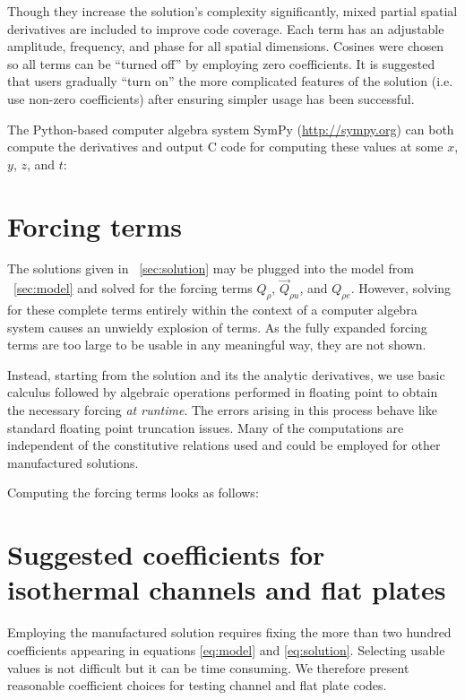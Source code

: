\documentclass[10pt,reqno]{amsart}
\begin{document}
Though they increase the solution's complexity significantly, mixed partial
spatial derivatives are included to improve code coverage.  Each term has an
adjustable amplitude, frequency, and phase for all spatial dimensions.  Cosines
were chosen so all terms can be ``turned off'' by employing zero coefficients.
It is suggested that users gradually ``turn on'' the more complicated features
of the solution (i.e. use non-zero coefficients) after ensuring simpler usage
has been successful.

The Python-based computer algebra system SymPy (\url{http://sympy.org})
can both compute the derivatives and output C code for computing these
values at some $x$, $y$, $z$, and $t$:


\section{Forcing terms}
\label{sec:forcing}

The solutions given in \textsection~\ref{sec:solution} may be plugged into the
model from \textsection~\ref{sec:model} and solved for the forcing terms
$Q_{\rho}$, $\vec{Q}_{\rho{}u}$, and $Q_{\rho{}e}$.  However, solving for these
complete terms entirely within the context of a computer algebra system causes
an unwieldy explosion of terms.  As the fully expanded forcing terms are too
large to be usable in any meaningful way, they are not shown.

Instead, starting from the solution and its the analytic derivatives, we use
basic calculus followed by algebraic operations performed in floating point to
obtain the necessary forcing \emph{at runtime}.  The errors arising in this
process behave like standard floating point truncation issues.  Many of the
computations are independent of the constitutive relations used and could be
employed for other manufactured solutions.

Computing the forcing terms looks as follows:


\section{Suggested coefficients for isothermal channels and flat plates}
\label{sec:suggest}

Employing the manufactured solution requires fixing the more than two hundred
coefficients appearing in equations \eqref{eq:model} and \eqref{eq:solution}.
Selecting usable values is not difficult but it can be time consuming.  We
therefore present reasonable coefficient choices for testing channel and flat
plate codes.
\end{document}
